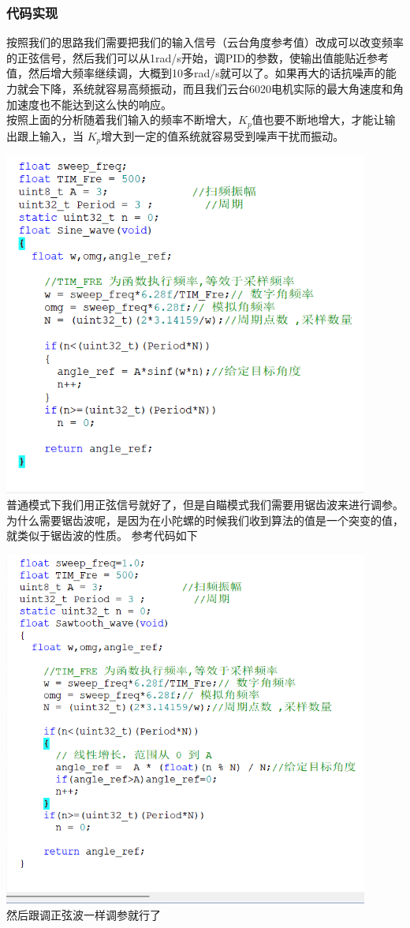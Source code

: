 \documentclass[UTF8,a4paper,12pt]{ctexart}
\begin{document}
    \subsubsection{代码实现}
    按照我们的思路我们需要把我们的输入信号（云台角度参考值）改成可以改变频率的正弦信号，然后我们可以从1rad/s开始，调PID的参数，使输出值能贴近参考值，然后增大频率继续调，大概到10多rad/s就可以了。如果再大的话抗噪声的能力就会下降，系统就容易高频振动，而且我们云台6020电机实际的最大角速度和角加速度也不能达到这么快的响应。 
    \\按照上面的分析随着我们输入的频率不断增大，$K_p $值也要不断地增大，才能让输出跟上输入，当 $K_p $增大到一定的值系统就容易受到噪声干扰而振动。
    \par \includegraphics[width=12cm]{picture/code_control_2.png}
    \\普通模式下我们用正弦信号就好了，但是自瞄模式我们需要用锯齿波来进行调参。为什么需要锯齿波呢，是因为在小陀螺的时候我们收到算法的值是一个突变的值，就类似于锯齿波的性质。
    参考代码如下
    \par \includegraphics[width=12cm]{picture/code_control.png}
    \\然后跟调正弦波一样调参就行了
\end{document}
